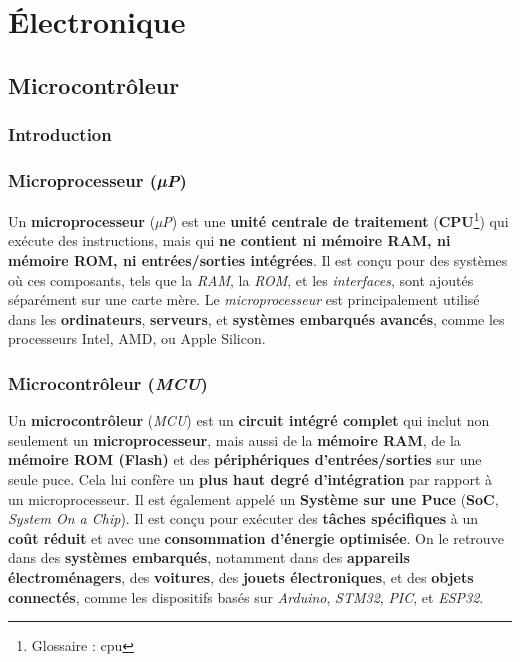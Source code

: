 \chapter{Électronique} \label{electronique}
\section{Microcontrôleur}

\subsection{Introduction}

\subsection{Microprocesseur (\textit{µP})}
Un \textbf{microprocesseur} (\textit{µP}) est une 
\textbf{unité centrale de traitement} (\textbf{CPU}\footnote{Glossaire : \gls{cpu}}) qui exécute des 
instructions, mais qui \textbf{ne contient ni mémoire RAM, ni mémoire ROM, ni 
entrées/sorties intégrées}. Il est conçu pour des systèmes où ces composants, 
tels que la \textit{RAM}, la \textit{ROM}, et les \textit{interfaces}, sont 
ajoutés séparément sur une carte mère. Le \textit{microprocesseur} est 
principalement utilisé dans les \textbf{ordinateurs}, \textbf{serveurs}, et 
\textbf{systèmes embarqués avancés}, comme les processeurs Intel, AMD, ou Apple 
Silicon.\par

\subsection{Microcontrôleur (\textit{MCU})}
Un \textbf{microcontrôleur} (\textit{MCU}) est un \textbf{circuit intégré complet} 
qui inclut non seulement un \textbf{microprocesseur}, mais aussi de la 
\textbf{mémoire RAM}, de la \textbf{mémoire ROM (Flash)} et des 
\textbf{périphériques d'entrées/sorties} sur une seule puce. Cela lui confère un 
\textbf{plus haut degré d'intégration} par rapport à un microprocesseur. Il est 
également appelé un \textbf{Système sur une Puce} (\textbf{SoC}, 
\textit{System On a Chip}). Il est conçu pour exécuter des 
\textbf{tâches spécifiques} à un \textbf{coût réduit} et avec une 
\textbf{consommation d'énergie optimisée}. On le retrouve dans des 
\textbf{systèmes embarqués}, notamment dans des 
\textbf{appareils électroménagers}, des \textbf{voitures}, des 
\textbf{jouets électroniques}, et des \textbf{objets connectés}, comme les 
dispositifs basés sur \textit{Arduino}, \textit{STM32}, \textit{PIC}, et 
\textit{ESP32}.\par

